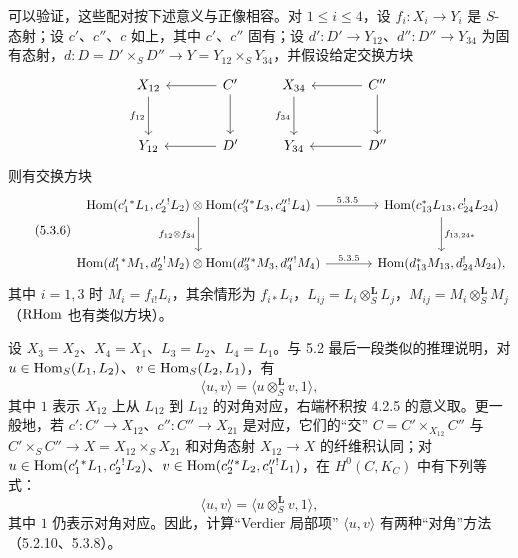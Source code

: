 可以验证，这些配对按下述意义与正像相容。对 $1\leq i\leq4$，设 $f_i:X_i\to Y_i$ 是 $S$-态射；设 $c'$、$c''$、$c$ 如上，其中 $c'$、$c''$ 固有；设 $d':D'\to Y_{12}$、$d'':D''\to Y_{34}$ 为固有态射，$d:D=D'\times_SD''\to Y=Y_{12}\times_SY_{34}$，并假设给定交换方块
\[
\begin{tikzcd}[column sep=large,row sep=large]
X_{12} \arrow[d,"f_{12}"'] & C' \arrow[l] \arrow[d] \\
Y_{12} & D' \arrow[l]
\end{tikzcd}
\qquad
\begin{tikzcd}[column sep=large,row sep=large]
X_{34} \arrow[d,"f_{34}"'] & C'' \arrow[l] \arrow[d] \\
Y_{34} & D'' \arrow[l]
\end{tikzcd}
\]
则有交换方块
\begin{equation}
\tag{5.3.6}
\begin{tikzcd}[column sep=large,row sep=large]
\Hom(c_1'{}^*L_1,c_2'{}^!L_2)\otimes\Hom(c_3''{}^*L_3,c_4''{}^!L_4) \arrow[r,"5.3.5"] \arrow[d,"f_{12}\otimes f_{34}"']
& \Hom(c_{13}^*L_{13},c_{24}^!L_{24}) \arrow[d,"f_{13,24*}"] \\
\Hom(d_1'{}^*M_1,d_2'{}^!M_2)\otimes\Hom(d_3''{}^*M_3,d_4''{}^!M_4) \arrow[r,"5.3.5"]
& \Hom(d_{13}^*M_{13},d_{24}^!M_{24}),
\end{tikzcd}
\end{equation}
其中 $i=1,3$ 时 $M_i=f_{i!}L_i$，其余情形为 $f_{i*}L_i$，$L_{ij}=L_i\otimes_S^{\mathbf L}L_j$，$M_{ij}=M_i\otimes_S^{\mathbf L}M_j$（$\mathrm{RHom}$ 也有类似方块）。

设 $X_3=X_2$、$X_4=X_1$、$L_3=L_2$、$L_4=L_1$。与 5.2 最后一段类似的推理说明，对 $u\in\operatorname{Hom}_S(L_1,L_2)$、$v\in\operatorname{Hom}_S(L_2,L_1)$，有
\begin{equation}
\tag{5.3.7}
\langle u,v\rangle=\langle u\otimes_S^{\mathbf L}v,1\rangle,
\end{equation}
其中 $1$ 表示 $X_{12}$ 上从 $L_{12}$ 到 $L_{12}$ 的对角对应，右端杯积按 4.2.5 的意义取。更一般地，若 $c':C'\to X_{12}$、$c'':C''\to X_{21}$ 是对应，它们的“交” $C=C'\times_{X_{12}}C''$ 与 $C'\times_SC''\to X=X_{12}\times_SX_{21}$ 和对角态射 $X_{12}\to X$ 的纤维积认同；对 $u\in\operatorname{Hom}(c_1'{}^*L_1,c_2'{}^!L_2)$、$v\in\operatorname{Hom}(c_2''{}^*L_2,c_1''{}^!L_1)$，在 $H^0(C,K_C)$ 中有下列等式：
\begin{equation}
\tag{5.3.8}
\langle u,v\rangle=\langle u\otimes_S^{\mathbf L}v,1\rangle,
\end{equation}
其中 $1$ 仍表示对角对应。因此，计算“Verdier 局部项” $\langle u,v\rangle$ 有两种“对角”方法（5.2.10、5.3.8）。

